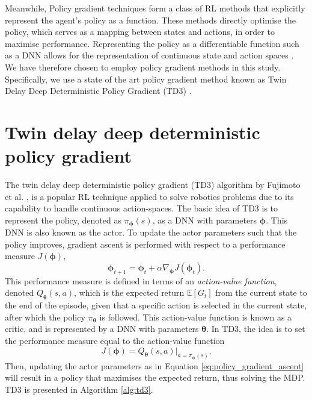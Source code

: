 Meanwhile, Policy gradient techniques form a class of RL methods that explicitly represent the agent's policy as a function.
These methods directly optimise the policy, which serves as a mapping between states and actions, in order to maximise performance.
Representing the policy as a differentiable function such as a DNN allows for the representation of continuous state and action spaces \cite{silver2014}.
We have therefore chosen to employ policy gradient methods in this study.
Specifically, we use a state of the art policy gradient method known as Twin Delay Deep Deterministic Policy Gradient (TD3) \cite{Fujimoto2018}.








\section{Twin delay deep deterministic policy gradient}\label{sec:td3}

The twin delay deep deterministic policy gradient (TD3) algorithm by Fujimoto et al. \cite{Fujimoto2018}, is a popular RL technique applied to solve robotics problems due to its capability to handle continuous action-spaces.
The basic idea of TD3 is to represent the policy, denoted as $\pi_{\bm{\phi}}(s)$, as a DNN with parameters $\bm{\phi}$.
This DNN is also known as the actor.
To update the actor parameters such that the policy improves, gradient ascent is performed with respect to a performance measure $J(\bm{\phi})$,
\begin{equation}\label{eq:policy_gradient_ascent}
    \bm{\phi}_{t+1} = \bm{\phi}_{t} + \alpha \nabla_{\bm{\phi}} J(\bm{\phi}_t).
\end{equation}
This performance measure is defined in terms of an \emph{action-value function}, denoted $Q_{\bm{\theta}}(s,a)$, which is the expected return $\mathbb{E}[G_t]$ from the current state to the end of the episode, given that a specific action is selected in the current state, after which the policy $\pi_{\bm{\theta}}$ is followed.
This action-value function is known as a critic, and is represented by a DNN with parameters $\bm{\theta}$.
In TD3, the idea is to set the performance measure equal to the action-value function
\begin{equation}
    J(\bm{\phi}) = Q_{\bm{\theta}}(s,a)| _{a=\pi_{\bm{\phi}}(s)}.
\end{equation}
Then, updating the actor parameters as in Equation \ref{eq:policy_gradient_ascent} will result in a policy that maximises the expected return, thus solving the MDP. 
TD3 is presented in Algorithm \ref{alg:td3}.


